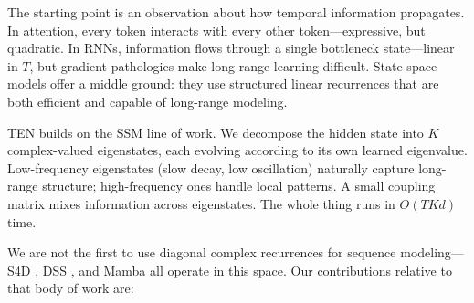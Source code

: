 \documentclass{article}
\begin{document}
The starting point is an observation about how temporal information propagates. In attention, every token interacts with every other token---expressive, but quadratic. In RNNs, information flows through a single bottleneck state---linear in $T$, but gradient pathologies make long-range learning difficult. State-space models offer a middle ground: they use structured linear recurrences that are both efficient and capable of long-range modeling.

TEN builds on the SSM line of work. We decompose the hidden state into $K$ complex-valued eigenstates, each evolving according to its own learned eigenvalue. Low-frequency eigenstates (slow decay, low oscillation) naturally capture long-range structure; high-frequency ones handle local patterns. A small coupling matrix mixes information across eigenstates. The whole thing runs in $O(TKd)$ time.

We are not the first to use diagonal complex recurrences for sequence modeling---S4D \cite{gu2021efficiently}, DSS \cite{gupta2022diagonal}, and Mamba \cite{gu2023mamba} all operate in this space. Our contributions relative to that body of work are:
\end{document}
